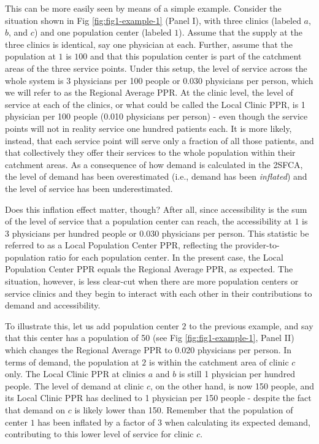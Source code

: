 \documentclass[10pt,letterpaper]{article}
\begin{document}
This can be more easily seen by means of a simple example. Consider the
situation shown in Fig \ref{fig:fig1-example-1} (Panel I), with three
clinics (labeled \(a\), \(b\), and \(c\)) and one population center
(labeled \(1\)). Assume that the supply at the three clinics is
identical, say one physician at each. Further, assume that the
population at \(1\) is \(100\) and that this population center is part
of the catchment areas of the three service points. Under this setup,
the level of service across the whole system is 3 physicians per 100
people or 0.030 physicians per person, which we will refer to as the
Regional Average PPR. At the clinic level, the level of service at each
of the clinics, or what could be called the Local Clinic PPR, is 1
physician per 100 people (0.010 physicians per person) - even though the
service points will not in reality service one hundred patients each. It
is more likely, instead, that each service point will serve only a
fraction of all those patients, and that collectively they offer their
services to the whole population within their catchment areas. As a
consequence of how demand is calculated in the 2SFCA, the level of
demand has been overestimated (i.e., demand has been \emph{inflated})
and the level of service has been underestimated.

Does this inflation effect matter, though? After all, since
accessibility is the sum of the level of service that a population
center can reach, the accessibility at \(1\) is 3 physicians per hundred
people or 0.030 physicians per person. This statistic be referred to as
a Local Population Center PPR, reflecting the provider-to-population
ratio for each population center. In the present case, the Local
Population Center PPR equals the Regional Average PPR, as expected. The
situation, however, is less clear-cut when there are more population
centers or service clinics and they begin to interact with each other in
their contributions to demand and accessibility.

To illustrate this, let us add population center \(2\) to the previous
example, and say that this center has a population of 50 (see Fig
\ref{fig:fig1-example-1}, Panel II) which changes the Regional Average
PPR to 0.020 physicians per person. In terms of demand, the population
at \(2\) is within the catchment area of clinic \(c\) only. The Local
Clinic PPR at clinics \(a\) and \(b\) is still 1 physician per hundred
people. The level of demand at clinic \(c\), on the other hand, is now
150 people, and its Local Clinic PPR has declined to 1 physician per 150
people - despite the fact that demand on \(c\) is likely lower than 150.
Remember that the population of center \(1\) has been inflated by a
factor of 3 when calculating its expected demand, contributing to this
lower level of service for clinic \(c\).
\end{document}
